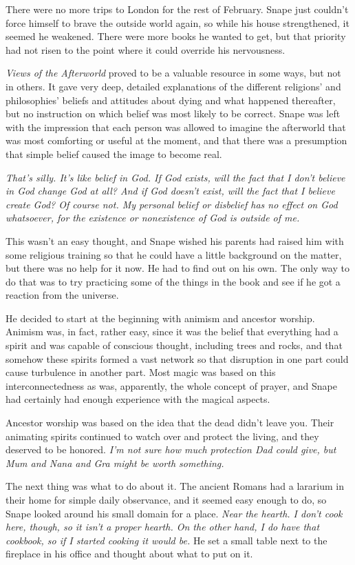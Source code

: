 There were no more trips to London for the rest of February. Snape just couldn't force himself to brave the outside world again, so while his house strengthened, it seemed he weakened. There were more books he wanted to get, but that priority had not risen to the point where it could override his nervousness.

\emph{Views of the Afterworld} proved to be a valuable resource in some ways, but not in others. It gave very deep, detailed explanations of the different religions' and philosophies' beliefs and attitudes about dying and what happened thereafter, but no instruction on which belief was most likely to be correct. Snape was left with the impression that each person was allowed to imagine the afterworld that was most comforting or useful at the moment, and that there was a presumption that simple belief caused the image to become real.

\emph{That's silly. It's like belief in God. If God exists, will the fact that I don't believe in God change God at all? And if God doesn't exist, will the fact that I believe create God? Of course not. My personal belief or disbelief has no effect on God whatsoever, for the existence or nonexistence of God is outside of me.}

This wasn't an easy thought, and Snape wished his parents had raised him with some religious training so that he could have a little background on the matter, but there was no help for it now. He had to find out on his own. The only way to do that was to try practicing some of the things in the book and see if he got a reaction from the universe.

He decided to start at the beginning with animism and ancestor worship. Animism was, in fact, rather easy, since it was the belief that everything had a spirit and was capable of conscious thought, including trees and rocks, and that somehow these spirits formed a vast network so that disruption in one part could cause turbulence in another part. Most magic was based on this interconnectedness as was, apparently, the whole concept of prayer, and Snape had certainly had enough experience with the magical aspects.

Ancestor worship was based on the idea that the dead didn't leave you. Their animating spirits continued to watch over and protect the living, and they deserved to be honored. \emph{I'm not sure how much protection Dad could give, but Mum and Nana and Gra might be worth something.}

The next thing was what to do about it. The ancient Romans had a lararium in their home for simple daily observance, and it seemed easy enough to do, so Snape looked around his small domain for a place. \emph{Near the hearth. I don't cook here, though, so it isn't a proper hearth. On the other hand, I do have that cookbook, so if I started cooking it would be.} He set a small table next to the fireplace in his office and thought about what to put on it.

